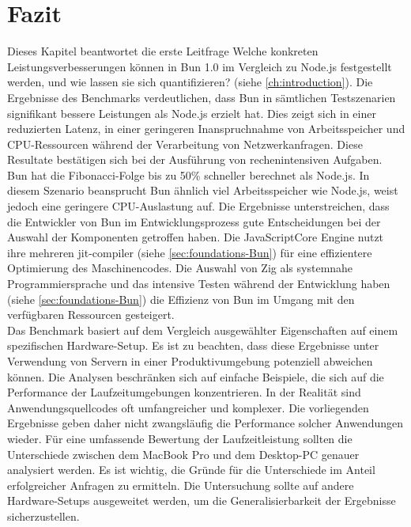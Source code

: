 \section{Fazit} \label{sec:performance-conclusion}
Dieses Kapitel beantwortet die erste Leitfrage \glqq Welche konkreten Leistungsverbesserungen können in Bun 1.0 im Vergleich zu Node.js festgestellt werden, und wie lassen sie sich quantifizieren?\grqq{} (siehe \autoref{ch:introduction}). Die Ergebnisse des Benchmarks verdeutlichen, dass Bun in sämtlichen Testszenarien signifikant bessere Leistungen als Node.js erzielt hat. Dies zeigt sich in einer reduzierten Latenz, in einer geringeren Inanspruchnahme von Arbeitsspeicher und CPU-Ressourcen während der Verarbeitung von Netzwerkanfragen. Diese Resultate bestätigen sich bei der Ausführung von rechenintensiven Aufgaben. Bun hat die Fibonacci-Folge bis zu 50\% schneller berechnet als Node.js. In diesem Szenario beansprucht Bun ähnlich viel Arbeitsspeicher wie Node.js, weist jedoch eine geringere CPU-Auslastung auf. \newline
Die Ergebnisse unterstreichen, dass die Entwickler von Bun im Entwicklungsprozess gute Entscheidungen bei der Auswahl der Komponenten getroffen haben. Die JavaScriptCore Engine nutzt ihre mehreren \ac{jit-compiler} (siehe \autoref{sec:foundations-Bun}) für eine effizientere Optimierung des Maschinencodes. Die Auswahl von Zig als systemnahe Programmiersprache und das intensive Testen während der Entwicklung haben (siehe \autoref{sec:foundations-Bun}) die Effizienz von Bun im Umgang mit den verfügbaren Ressourcen gesteigert.\\

\noindent
Das Benchmark basiert auf dem Vergleich ausgewählter Eigenschaften auf einem spezifischen Hardware-Setup. Es ist zu beachten, dass diese Ergebnisse unter Verwendung von Servern in einer Produktivumgebung potenziell abweichen können. Die Analysen beschränken sich auf einfache Beispiele, die sich auf die Performance der Laufzeitumgebungen konzentrieren. In der Realität sind Anwendungsquellcodes oft umfangreicher und komplexer. Die vorliegenden Ergebnisse geben daher nicht zwangsläufig die Performance solcher Anwendungen wieder. Für eine umfassende Bewertung der Laufzeitleistung sollten die Unterschiede zwischen dem MacBook Pro und dem Desktop-PC genauer analysiert werden. Es ist wichtig, die Gründe für die Unterschiede im Anteil erfolgreicher Anfragen zu ermitteln. Die Untersuchung sollte auf andere Hardware-Setups ausgeweitet werden, um die Generalisierbarkeit der Ergebnisse sicherzustellen.